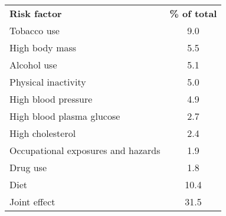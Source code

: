 \bgroup
\def\arraystretch{1.2}
\begin{tabular}{lc}
\toprule
\textbf{Risk factor} & \textbf{\% of total} \\ \cmidrule(lr){1-2}
Tobacco use & 9.0 \\
High body mass & 5.5 \\
Alcohol use & 5.1 \\
Physical inactivity & 5.0 \\
High blood pressure & 4.9 \\
High blood plasma glucose & 2.7 \\
High cholesterol & 2.4 \\
Occupational exposures and hazards & 1.9 \\
Drug use & 1.8 \\
Diet & 10.4 \\
Joint effect & 31.5 \\
\bottomrule
\end{tabular}
\egroup